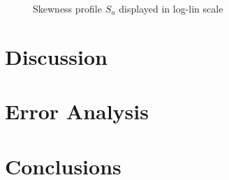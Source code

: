 \documentclass[12pt]{article}
\begin{document}
\begin{figure}
    \centering
        \resizebox{0.8\linewidth}{!}{}
    \caption{Skewness profile $S_u$ displayed in log-lin scale}
    \label{fig:Skewness_Profile}
\end{figure}





\section{Discussion}

\section{Error Analysis}

\section{Conclusions}

\newpage


\end{document}

